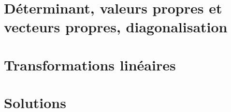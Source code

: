 \documentclass[11pt,french]{book} %
\begin{document}
\part[Déterminant, valeurs et vecteurs propres, diagonalisation]{Déterminant, valeurs propres et vecteurs propres, diagonalisation}











\renewcommand{\partintrotext}{En mathématiques, quand on étudie un domaine, il est aussi important d'étudier les objets considérés --- les \emph{espaces vectoriels} dans notre cas --- que de comprendre les relations entre ces objets --- les \stress{transformations linéaires} dans notre cas. Ces relations entre les objets doivent être «~compatibles~» avec la structure des objets ; on aura donc quelques contraintes pour définir les transformation linéaires.  Notez que nous avons déjà vu et utilisé plusieurs de transformations linéaires : par exemple la multiplication par une matrice $A$, ou encore la projection sur un sous-espace.}

\part{Transformations linéaires}






\renewcommand{\partintrotext}{Essayez de résoudre chaque exercice avant d'en regarder la solution... Sinon votre raisonnement sera biaisé et vous aurez fort probablement besoin d’un nouvel exercice pour avoir une meilleure compréhension des choses... C'est en forgeant que l'on devient forgeron~!}
\part{Solutions}
\end{document}
